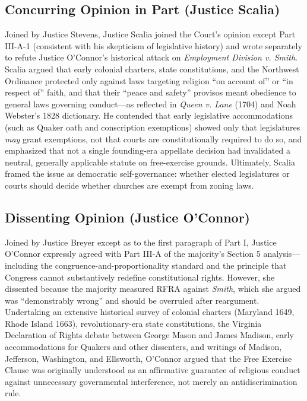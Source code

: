 \documentclass[12pt]{article}
\begin{document}
\subsection{Concurring Opinion in Part (Justice Scalia)}

Joined by Justice Stevens, Justice Scalia joined the Court's opinion except Part III-A-1 (consistent with his skepticism of legislative history) and wrote separately to refute Justice O'Connor's historical attack on \textit{Employment Division v. Smith}. Scalia argued that early colonial charters, state constitutions, and the Northwest Ordinance protected only against laws targeting religion ``on account of'' or ``in respect of'' faith, and that their ``peace and safety'' provisos meant obedience to general laws governing conduct---as reflected in \textit{Queen v. Lane} (1704) and Noah Webster's 1828 dictionary. He contended that early legislative accommodations (such as Quaker oath and conscription exemptions) showed only that legislatures \textit{may} grant exemptions, not that courts are constitutionally required to do so, and emphasized that not a single founding-era appellate decision had invalidated a neutral, generally applicable statute on free-exercise grounds. Ultimately, Scalia framed the issue as democratic self-governance: whether elected legislatures or courts should decide whether churches are exempt from zoning laws.

\subsection{Dissenting Opinion (Justice O'Connor)}

Joined by Justice Breyer except as to the first paragraph of Part I, Justice O'Connor expressly agreed with Part III-A of the majority's Section 5 analysis---including the congruence-and-proportionality standard and the principle that Congress cannot substantively redefine constitutional rights. However, she dissented because the majority measured RFRA against \textit{Smith}, which she argued was ``demonstrably wrong'' and should be overruled after reargument. Undertaking an extensive historical survey of colonial charters (Maryland 1649, Rhode Island 1663), revolutionary-era state constitutions, the Virginia Declaration of Rights debate between George Mason and James Madison, early accommodations for Quakers and other dissenters, and writings of Madison, Jefferson, Washington, and Ellsworth, O'Connor argued that the Free Exercise Clause was originally understood as an affirmative guarantee of religious conduct against unnecessary governmental interference, not merely an antidiscrimination rule.
\end{document}
